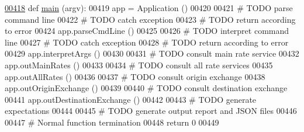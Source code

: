 \begin{DoxyCode}
\hypertarget{namespacee2e.tex_l00418}{}\hyperlink{namespacee2e_afb3e7d384688a07b72e1df5201192375}{00418} \textcolor{keyword}{def }\hyperlink{namespacee2e_afb3e7d384688a07b72e1df5201192375}{main} (argv):
00419     app = Application ()
00420     
00421     \textcolor{comment}{# TODO parse command line }
00422     \textcolor{comment}{# TODO catch exception}
00423     \textcolor{comment}{# TODO return according to error}
00424     app.parseCmdLine ()
00425     
00426     \textcolor{comment}{# TODO interpret command line }
00427     \textcolor{comment}{# TODO catch exception}
00428     \textcolor{comment}{# TODO return according to error}
00429     app.interpretArgs ()
00430     
00431     \textcolor{comment}{# TODO consult main rate service}
00432     app.outMainRates ()
00433     
00434     \textcolor{comment}{# TODO consult all rate services}
00435     app.outAllRates ()
00436     
00437     \textcolor{comment}{# TODO consult origin exchange }
00438     app.outOriginExchange ()
00439     
00440     \textcolor{comment}{# TODO consult destination exchange}
00441     app.outDestinationExchange ()
00442     
00443     \textcolor{comment}{# TODO generate expectations}
00444     
00445     \textcolor{comment}{# TODO generate output report and JSON files}
00446 
00447     \textcolor{comment}{# Normal function termination}
00448     \textcolor{keywordflow}{return} 0
00449 
\end{DoxyCode}
